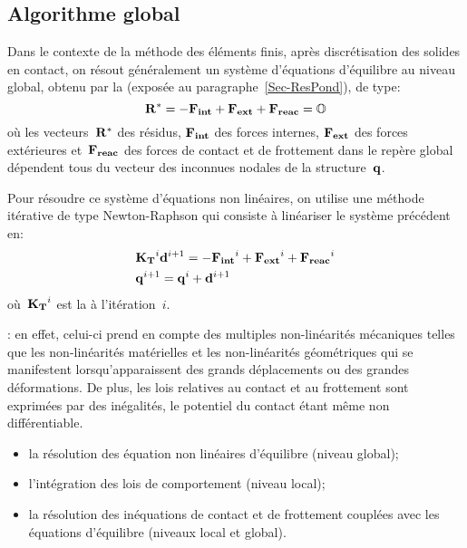 \medskip
\subsection{Algorithme global}

Dans le contexte de la méthode des éléments finis, après discrétisation des solides en contact, on résout généralement un système d'équations d'équilibre au niveau global, obtenu par la  (exposée au paragraphe~\ref{Sec-ResPond}), de type:
\begin{equation}
\VV{R^*} = -\VV{F_{int}} + \VV{F_{ext}} + \VV{F_{reac}} = \VV{\mO}
\end{equation}
où les vecteurs~$\VV{R^*}$ des résidus, $\VV{F_{int}}$ des forces internes, $\VV{F_{ext}}$ des forces extérieures et~$\VV{F_{reac}}$ des forces de contact et de frottement dans le repère global dépendent tous du vecteur des inconnues nodales de la structure~$\VV{q}$.

\medskip
Pour résoudre ce système d'équations non linéaires, on utilise une méthode itérative de type Newton-Raphson qui consiste à linéariser le système précédent en:
\begin{align}
&\MM{K_T}^i \VV{d}^{i+1} = -\VV{F_{int}}^i + \VV{F_{ext}}^i+\VV{F_{reac}}^i\\
&\VV{q}^{i+1} = \VV{q}^i+\VV{d}^{i+1} 
\end{align}
où~$\MM{K_T}^i$ est la  à l'itération~$i$.

\medskip
{}: en effet, celui-ci prend en compte des multiples non-linéarités mécaniques telles que les non-linéarités matérielles et les non-linéarités géométriques qui se manifestent lorsqu'apparaissent des grands déplacements ou des grandes déformations. De plus, les lois relatives au contact et au frottement sont exprimées par des inégalités, le potentiel
du contact étant même non différentiable. 
\begin{itemize}
  \item la résolution des équation non linéaires d'équilibre (niveau global);
  \item l'intégration des lois de comportement (niveau local);
  \item la résolution des inéquations de contact et de frottement couplées avec les équations
	d'équilibre (niveaux local et global).
\end{itemize}


